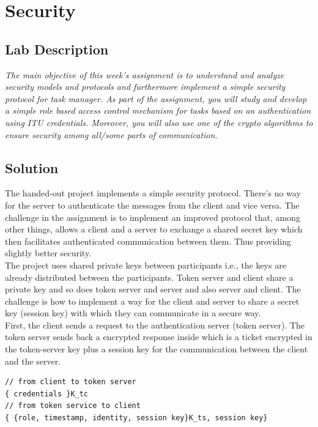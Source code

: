 \chapter{Security}
\minitoc

\section{Lab Description}
\textit{The main objective of this week's assignment is to understand and analyze security models and protocols and furthermore implement a simple security protocol for task manager. As part of the assignment, you will study and develop a simple role based access control mechanism for tasks based on an authentication using ITU credentials. Moreover, you will also use one of the crypto algorithms to ensure security among all/some parts of communication.}

\section{Solution}

The handed-out project implements a simple security protocol. There's no way for the server to authenticate the messages from the client and vice versa. The challenge in the assignment is to implement an improved protocol that, among other things, allows a client and a server to exchange a shared secret key which then facilitates authenticated communication between them. Thus providing slightly better security.  \\

The project uses shared private keys between participants i.e., the keys are already distributed between the participants. Token server and client share a private key and so does token server and server and also server and client. The challenge is how to implement a way for the client and server to share a secret key (session key) with which they can communicate in a secure way. \\

First, the client sends a request to the authentication server (token server). The token server sends back a encrypted response inside which is a ticket encrypted in the token-server key plus a session key for the communication between the client and the server. \\

\begin{lstlisting}
// from client to token server
{ credentials }K_tc
// from token service to client
{ {role, timestamp, identity, session key}K_ts, session key} 
\end{lstlisting}

